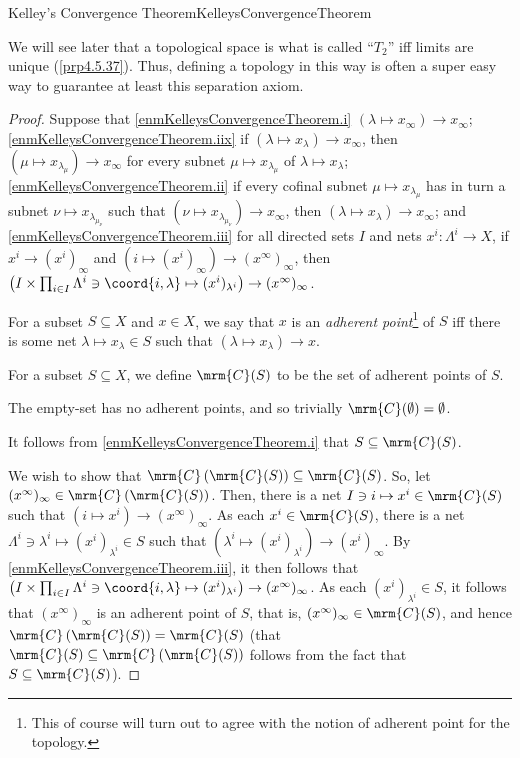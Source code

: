 \begin{thm}{Kelley's Convergence Theorem}{KelleysConvergenceTheorem}
\begin{rmk}
\end{rmk}
\begin{rmk}
We will see later that a topological space is what is called ``$T_2$'' iff limits are unique (\cref{prp4.5.37}).  Thus, defining a topology in this way is often a super easy way to guarantee at least this separation axiom.
\end{rmk}
\begin{proof}
Suppose that \cref{enmKelleysConvergenceTheorem.i} $(\lambda \mapsto x_\infty)\to x_\infty$; \cref{enmKelleysConvergenceTheorem.iix} if $(\lambda \mapsto x_{\lambda})\to x_{\infty}$, then $(\mu \mapsto x_{\lambda _{\mu}})\to x_{\infty}$ for every subnet $\mu \mapsto x_{\lambda _{\mu}}$ of $\lambda \mapsto x_{\lambda}$; \cref{enmKelleysConvergenceTheorem.ii} if every cofinal subnet $\mu \mapsto x_{\lambda _\mu}$ has in turn a subnet $\nu \mapsto x_{\lambda _{\mu _\nu}}$ such that $(\nu \mapsto x_{\lambda _{\mu _\nu}})\to x_\infty$, then $(\lambda \mapsto x_{\lambda})\to x_{\infty}$; and \cref{enmKelleysConvergenceTheorem.iii} for all directed sets $I$ and nets $x^i:\Lambda ^i\rightarrow X$, if $x^i\to (x^i)_\infty$ and $(i\mapsto (x^i)_\infty )\to (x^\infty )_\infty$, then $\left( I\times \prod _{i\in I}\Lambda ^i\ni \coord{i,\lambda}\mapsto (x^i)_{\lambda ^i}\right) \to (x^\infty )_\infty$.

For a subset $S\subseteq X$ and $x\in X$, we say that $x$ is an \emph{adherent point}\footnote{This of course will turn out to agree with the notion of adherent point for the topology.} of $S$ iff there is some net $\lambda \mapsto x_\lambda \in S$ such that $(\lambda \mapsto x_\lambda )\to x$.

For a subset $S\subseteq X$, we define $\mrm{C}(S)$ to be the set of adherent points of $S$.

The empty-set has no adherent points, and so trivially $\mrm{C}(\emptyset )=\emptyset$.

It follows from \cref{enmKelleysConvergenceTheorem.i} that $S\subseteq \mrm{C}(S)$.

We wish to show that $\mrm{C}\left( \mrm{C}(S)\right) \subseteq \mrm{C}(S)$.  So, let $(x^\infty )_\infty \in \mrm{C}\left( \mrm{C}(S)\right)$.  Then, there is a net $I\ni i\mapsto x^i\in \mrm{C}(S)$ such that $(i\mapsto x^i )\to (x^\infty )_\infty$.  As each $x^i\in \mrm{C}(S)$, there is a net $\Lambda ^i\ni \lambda ^i\mapsto (x^i)_{\lambda ^i}\in S$ such that $\left( \lambda ^i\mapsto (x^i)_{\lambda ^i}\right) \to (x^i)_\infty$.  By \cref{enmKelleysConvergenceTheorem.iii}, it then follows that $\left( I\times \prod _{i\in I}\Lambda ^i\ni \coord{i,\lambda}\mapsto (x^i)_{\lambda ^i}\right) \to (x^\infty )_\infty$.  As each $(x^i)_{\lambda ^i}\in S$, it follows that $(x^\infty )_\infty$ is an adherent point of $S$, that is, $(x^{\infty})_{\infty}\in \mrm{C}(S)$, and hence $\mrm{C}\left( \mrm{C}(S)\right) =\mrm{C}(S)$ (that $\mrm{C}(S)\subseteq \mrm{C}\left( \mrm{C}(S)\right)$ follows from the fact that $S\subseteq \mrm{C}(S)$).


\end{proof}
\end{thm}
